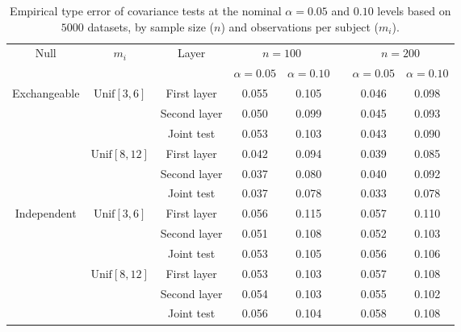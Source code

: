 \documentclass[submit]{smj}
\begin{document}
\begin{table}[!h]
	\centering
	\caption{Empirical type \uppercase\expandafter{} error of covariance tests at the nominal $\alpha=0.05$ and $0.10$ levels based on $5000$ datasets, by sample size ($n$) and observations per subject ($m_i$).}
	\label{tab:size}
	\begin{adjustbox}{width=\textwidth}
	\begin{tabular}{c|c|c|ccccc}
		\hline
		\multirow{2}{*}{Null}&\multirow{2}{*}{$m_i$}& \multirow{2}{*}{Layer} & \multicolumn{2}{c}{$n=100$}&& \multicolumn{2}{c}{$n=200$}\\
		&&& $\alpha=0.05$ & $\alpha=0.10$ && $\alpha=0.05$ & $\alpha=0.10$\\
		\hline
		\multirow{6}{*}{Exchangeable}&	\multirow{3}{*}{$\text{Unif}[3,6]$}	 &First layer& 0.055 &0.105 && 0.046&0.098 \\
		& & Second layer & 0.050 &0.099 && 0.045 & 0.093 \\
		& & Joint test & 0.053 &0.103 && 0.043&0.090 \\
		\cline{2-8}
		&	\multirow{3}{*}{$\text{Unif}[8,12]$} &First layer& 0.042 &0.094 && 0.039 & 0.085\\	
		& & Second layer & 0.037 & 0.080 && 0.040 & 0.092 \\
		& & Joint test & 0.037 &0.078&& 0.033 & 0.078  \\			
		\hline
		\multirow{6}{*}{Independent}&	\multirow{3}{*}{$\text{Unif}[3,6]$}	 &First layer& 0.056 &0.115 && 0.057& 0.110   \\
		& & Second layer & 0.051 & 0.108 && 0.052 & 0.103 \\
		& & Joint test & 0.053 & 0.105  && 0.056 & 0.106 \\	
		\cline{2-8}
		&	\multirow{3}{*}{$\text{Unif}[8,12]$} &First layer& 0.053 & 0.103 && 0.057 & 0.108	\\
		& & Second layer & 0.054 & 0.103 && 0.055 & 0.102  \\
		& & Joint test & 0.056 & 0.104 &&0.058 & 0.108 \\
		\hline	
	\end{tabular}
	\end{adjustbox}
\end{table}


\end{document}
